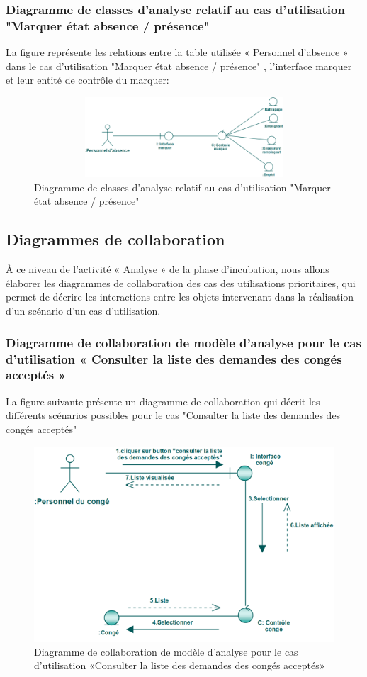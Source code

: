 \documentclass[12 pt ]{report}
\begin{document}
\subsubsection{Diagramme de classes d’analyse relatif au cas d’utilisation "Marquer état absence / présence" }
La figure  représente les relations entre la table utilisée « Personnel d'absence » dans le cas d’utilisation  "Marquer état absence / présence" , l’interface  marquer et  leur entité de  contrôle du marquer:
\begin{figure}[h]
\begin{center}
\includegraphics[width= 12cm , height =3cm]{cla_mar_abs.png}
\caption{Diagramme de classes d’analyse relatif au cas d’utilisation "Marquer état absence / présence"}
\end{center}
\end{figure}
\subsection{Diagrammes de collaboration }
 À ce niveau de l’activité « Analyse » de la phase d’incubation, nous allons élaborer les diagrammes de collaboration des cas des utilisations prioritaires, qui permet de décrire les interactions entre les
objets intervenant dans la réalisation d’un scénario d’un cas d’utilisation.
\subsubsection{Diagramme  de  collaboration  de  modèle  d'analyse  pour  le  cas  d'utilisation « Consulter la liste des demandes des congés acceptés »  }
La figure suivante présente un diagramme de collaboration qui décrit les différents
scénarios possibles pour le cas "Consulter la liste des demandes des congés acceptés"
\begin{figure}[h]
\begin{center}
\includegraphics[width= 14 cm , height =5 cm]{cccc.PNG}
 \caption{Diagramme  de  collaboration  de  modèle  d'analyse  pour  le  cas  d'utilisation «Consulter la liste des demandes des congés acceptés»}
\end{center}
\end{figure} 
\end{document}
